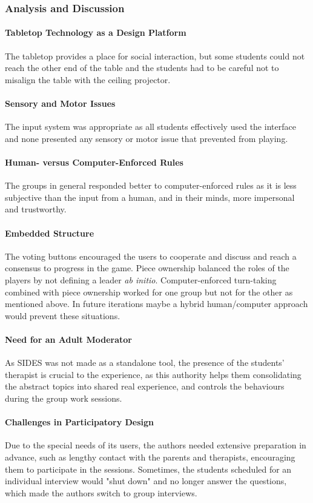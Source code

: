 \documentclass[runningheads]{llncs}
\begin{document}
\subsubsection{Analysis and Discussion}
\paragraph{Tabletop Technology as a Design Platform} The tabletop provides a place for social interaction, but some students could not reach the other end of the table and the students had to be careful not to misalign the table with the ceiling projector.
\paragraph{Sensory and Motor Issues} The input system was appropriate as all students effectively used the interface and none presented any sensory or motor issue that prevented from playing.
\paragraph{Human- versus Computer-Enforced Rules} The groups in general responded better to computer-enforced rules as it is less subjective than the input from a human, and in their minds, more impersonal and trustworthy.
\paragraph{Embedded Structure} The voting buttons encouraged the users to cooperate and discuss and reach a consensus to progress in the game. Piece ownership balanced the roles of the players by not defining a leader \textit{ab initio}. Computer-enforced turn-taking combined with piece ownership worked for one group but not for the other as mentioned above. In future iterations maybe a hybrid human/computer approach would prevent these situations.
\paragraph{Need for an Adult Moderator} As SIDES was not made as a standalone tool, the presence of the students' therapist is crucial to the experience, as this authority helps them consolidating the abstract topics into shared real experience, and controls the behaviours during the group work sessions.
\paragraph{Challenges in Participatory Design} Due to the special needs of its users, the authors needed extensive preparation in advance, such as lengthy contact with the parents and therapists, encouraging them to participate in the sessions. Sometimes, the students scheduled for an individual interview would "shut down" and no longer answer the questions, which made the authors switch to group interviews.
\end{document}
